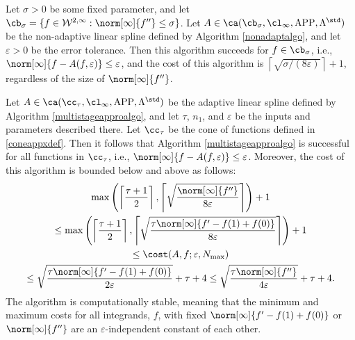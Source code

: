\begin{theorem} \label{multistageappxthm}
Let $\sigma >0$ be some fixed parameter, and let $\cb_{\sigma}=\{f \in  \mathcal{W}^{2,\infty} : \norm[\infty]{f''}\leq \sigma\}$. Let $A \in \ca(\cb_{\sigma}, \cl_{\infty}, \APP, \Lambda^{\std})$ be the non-adaptive linear spline defined by Algorithm \ref{nonadaptalgo}, and let $\varepsilon>0$ be the error tolerance. Then this algorithm succeeds for $f \in \cb_{\sigma}$, i.e., $\norm[\infty]{f - A(f,\varepsilon)} \le \varepsilon$, and the cost of this algorithm is $\left \lceil \sqrt{\sigma/(8\varepsilon)}\right \rceil + 1$, regardless of the size of $\norm[\infty]{f''}$.

Let $A \in \ca(\cc_{\tau}, \cl_{\infty}, \APP, \Lambda^{\std})$ be the adaptive linear spline defined by Algorithm \ref{multistageapproalgo}, and let $\tau$, $n_1$, and $\varepsilon$ be the inputs and parameters described there. Let $\cc_\tau$ be the cone of functions defined in \eqref{coneappxdef}.  Then it follows that Algorithm \ref{multistageapproalgo} is successful for all functions in $\cc_{\tau}$,  i.e.,  $\norm[\infty]{f - A(f,\varepsilon)} \le \varepsilon$.  Moreover, the cost of this algorithm is bounded below and above as follows:
\begin{multline}
\max \left(\left \lceil\frac{\tau+1}{2} \right \rceil, \left \lceil \sqrt{\frac{ \norm[\infty]{f''}}{8\varepsilon}} \right \rceil \right) +1 \\
\le \max \left(\left \lceil\frac{\tau+1}{2} \right \rceil, \left \lceil \sqrt{\frac{\tau \norm[\infty]{f'-f(1)+f(0)}}{8\varepsilon}} \right \rceil \right) +1 \\
\le
\cost(A,f;\varepsilon,N_{\max}) \\
\le \sqrt{\frac{\tau \norm[\infty]{f'-f(1)+f(0)}}{2\varepsilon}} + \tau + 4
\le \sqrt{\frac{\tau \norm[\infty]{f''} }{4\varepsilon}} + \tau + 4.
\end{multline}
The algorithm is computationally stable, meaning that the minimum and maximum costs for all integrands, $f$, with fixed $\norm[\infty]{f'-f(1)+f(0)}$ or $\norm[\infty]{f''}$ are an $\varepsilon$-independent constant of each other.
\end{theorem}

